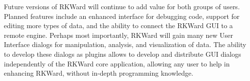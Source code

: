 
Future versions of RKWard will continue to add value for both groups of users. Planned features include
an enhanced interface for debugging  code, support for editing more types of data, and the
ability to connect the RKWard GUI to a remote  engine. Perhaps most importantly, RKWard will
gain many new User Interface dialogs for manipulation, analysis, and visualization of data. The ability to
develop these dialogs as plugins allows to develop and distribute GUI dialogs
independently of the RKWard core application, allowing any user to help in enhancing RKWard, without in-depth
programming knowledge.

